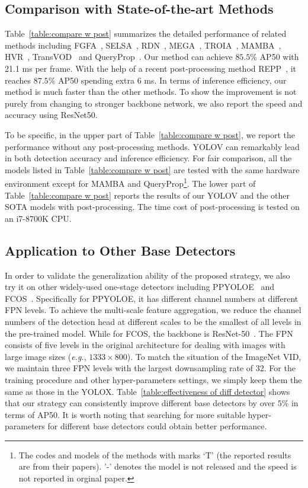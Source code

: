 \documentclass[letterpaper]{article} \usepackage{aaai23}  \usepackage{times}  \usepackage{helvet}  \usepackage{courier}  \usepackage[hyphens]{url}  \usepackage{graphicx} \urlstyle{rm} \def\UrlFont{\rm}  \usepackage{natbib}  \usepackage{caption} \usepackage{xcolor}
\begin{document}
\subsection{Comparison with State-of-the-art Methods}
Table~\ref{table:compare w post} summarizes the detailed performance of related methods including FGFA~\cite{zhu2017flow}, SELSA~\cite{wu2019sequence}, RDN~\cite{deng2019relation}, MEGA~\cite{chen2020memory}, TROIA~\cite{gong2021temporal}, MAMBA~\cite{sun2021mamba}, HVR~\cite{han2020mining}, TransVOD~\cite{he2021end} and QueryProp~\cite{he2022queryprop}. Our method can achieve $85.5\%$ AP50 with 21.1 ms per frame. With the help of a recent post-processing method REPP~\cite{sabater2020robust}, it reaches $87.5\%$ AP50 spending extra 6 ms. In terms of inference efficiency, our method is much faster than the other methods. To show the improvement is not purely from changing to stronger backbone network, we also report the speed and accuracy using ResNet50.

To be specific, in the upper part of Table~\ref{table:compare w post}, we report the performance without any post-processing methods. YOLOV can remarkably lead in both detection accuracy and inference efficiency. For fair comparison, all the models listed in Table~\ref{table:compare w post} are tested with the same hardware environment except for MAMBA and QueryProp\footnote{The codes and models of the methods with marks `T' (the reported results are from their papers). '-' denotes the model is not released and the speed is not reported in orginal paper.}.  The lower part of Table~\ref{table:compare w post} reports the results of our YOLOV and the other SOTA models with post-processing. The time cost of post-processing is tested on an i7-8700K CPU.

 
\subsection{Application to Other Base Detectors}
In order to validate the generalization ability of the proposed strategy, we also try it on other widely-used one-stage detectors including PPYOLOE~\cite{xu2022pp} and FCOS~\cite{tian2019fcos}. Specifically for PPYOLOE, it has different channel numbers at different FPN levels. To achieve the multi-scale feature aggregation, we reduce the channel numbers of the detection head at different scales to be the smallest of all levels in the pre-trained model. While for FCOS, the backbone is ResNet-50~\cite{he2016deep}. The FPN consists of five levels in the original architecture for dealing with images with large image sizes (\emph{e.g.}, $1333\times 800$). To match the situation of the ImageNet VID, we maintain three FPN levels with the largest downsampling rate of 32. For the training procedure and other hyper-parameters settings, we simply keep them the same as those in the YOLOX. Table~\ref{table:effectiveness of diff detector} shows that our strategy can consistently improve different base detectors by over $5\%$ in terms of AP50. It is worth noting that searching for more suitable hyper-parameters for different base detectors could obtain better performance.\\
\end{document}

